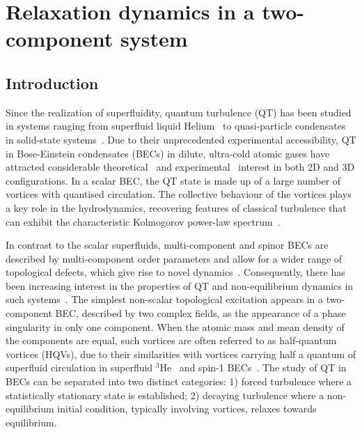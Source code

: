 \chapter{Relaxation dynamics in a two-component system}\label{ch:relaxation-dynamics-in-a-two-component-system}

\section{Introduction}
Since the realization of superfluidity, quantum turbulence (QT) has been studied
in systems ranging from superfluid liquid
Helium~\cite{Barenghi2014, Walmsley2014} to quasi-particle
condensates in solid-state systems~\cite{Kreil2018}.
Due to their unprecedented experimental accessibility, QT in Bose-Einstein
condensates (BECs) in dilute, ultra-cold atomic gases have attracted considerable
theoretical~\cite{Kobayashi2007,Numasato2010, Reeves2013,
Billam2014,Simula2014,Baggaley2018} and
experimental~\cite{Henn2009,Kwon2014,Seo2017,Navon2019,Gauthier2019,
Johnstone2019} interest in both 2D and 3D configurations.
In a scalar BEC, the QT state is made up of a large number of vortices with
quantised circulation.
The collective behaviour of the vortices plays a key role
in the hydrodynamics, recovering features of classical turbulence that can
exhibit the characteristic Kolmogorov power-law spectrum~\cite{Kobayashi2005}.


In contrast to the scalar superfluids, multi-component and spinor BECs are
described by multi-component order parameters and allow for a wider range of
topological defects, which give rise to novel dynamics~\cite{Kasamatsu2016,
Weiss2019,Kobayashi2009,Kasamatsu2005}.
Consequently, there has been increasing interest in the properties of QT and
non-equilibrium dynamics in such
systems~\cite{Salman2009, Schmied2019, Karl2013, Prufer2018, Hofmann2014}.
The simplest non-scalar topological excitation appears in a two-component BEC,
described by two complex fields, as the appearance of a phase singularity in
only one component. 
When the atomic mass and mean density of the components are equal, such vortices
are often referred to as half-quantum vortices (HQVs), due to their similarities
with vortices carrying half a quantum of superfluid circulation in superfluid
$^3$He~\cite{Autti2016} and spin-1
BECs~\cite{Leonhardt2000,Seo2015}.
The study of QT in BECs can be separated into two distinct categories: 1) forced
turbulence where a statistically stationary state is established;
2) decaying turbulence where a non-equilibrium initial condition, typically involving
vortices, relaxes towards equilibrium. 


